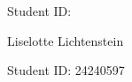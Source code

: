 \begin{titlepage}
    \centering
    \vspace*{0.2cm}
    
    {\Huge \mytitle \par}
    \vspace{1.4cm}
    
    {\Large \myassignment \par}    
    {\Large \mycourse \par}
    \vspace{1.4cm}
    
    {\Large \myname \par}

    {\Large Student ID: \myid \par}

    {\Large Liselotte Lichtenstein \par}

    {\Large Student ID: 24240597 \par}

    \vspace{0.9cm}



    \vfill
    
    {\Large \mydate \par}
\end{titlepage}